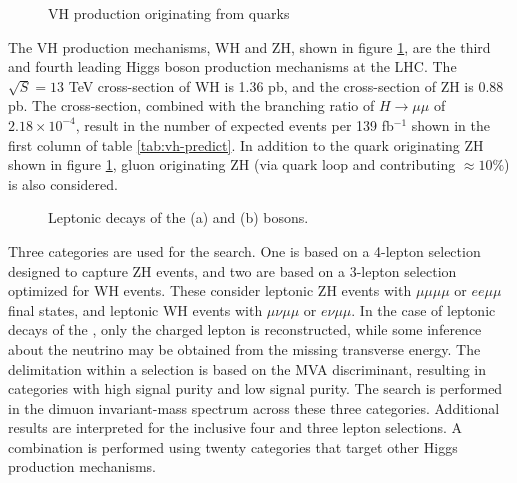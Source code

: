 \begin{figure}[htpb]
  \centering
  \caption{VH production originating from quarks}
    \label{fig:vh-prod}
\end{figure}

The VH production mechanisms, WH and ZH, shown in figure \ref{fig:vh-prod}, are the third and fourth leading Higgs boson production mechanisms at the LHC. The $\sqrt{S}=13$ TeV cross-section of WH is 1.36 pb, and the cross-section of ZH is 0.88 pb. The cross-section, combined with the branching ratio of $H\to\mu\mu$ of $2.18\times10^{-4}$, result in the number of expected events per 139 fb$^{-1}$ shown in the first column of table \ref{tab:vh-predict}. In addition to the quark originating ZH shown in figure \ref{fig:vh-prod}, gluon originating ZH (via quark loop and contributing $\approx10\%$) is also considered.


\begin{figure}[h!]
\captionsetup[subfigure]{position=b}
\centering
{}
\hspace{3em}
  \caption{Leptonic decays of the \W (a) and \Z (b) bosons.}
  \label{fig:vh-decay}
\end{figure}

Three categories are used for the search.
One is based on a 4-lepton selection designed to capture ZH events, and two are based on a 3-lepton selection optimized for WH events.
These consider leptonic ZH events with $\mu\mu\mu\mu$ or $ee\mu\mu$ final states, and leptonic WH events with $\mu\nu\mu\mu$ or $e\nu\mu\mu$.
In the case of leptonic decays of the \W, only the charged lepton is reconstructed, while some inference about the neutrino may be obtained from the missing transverse energy.
The delimitation within a selection is based on the MVA discriminant, resulting in categories with high signal purity and low signal purity.
The search is performed in the dimuon invariant-mass spectrum across these three categories.
Additional results are interpreted for the inclusive four and three lepton selections.
A combination is performed using twenty categories that target other Higgs production mechanisms.

